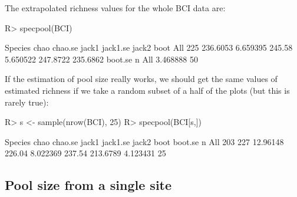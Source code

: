 \documentclass[article,nojss]{jss}
\begin{document}
The extrapolated richness values for the whole BCI data are:
\begin{Schunk}
\begin{Sinput}
R> specpool(BCI)
\end{Sinput}
\begin{Soutput}
    Species     chao  chao.se  jack1 jack1.se    jack2     boot
All     225 236.6053 6.659395 245.58 5.650522 247.8722 235.6862
     boot.se  n
All 3.468888 50
\end{Soutput}
\end{Schunk}
If the estimation of pool size really works, we should get the same
values of estimated richness if we take a random subset of a half of
the plots (but this is rarely true):
\begin{Schunk}
\begin{Sinput}
R> s <- sample(nrow(BCI), 25)
R> specpool(BCI[s,])
\end{Sinput}
\begin{Soutput}
    Species chao  chao.se  jack1 jack1.se  jack2     boot  boot.se  n
All     203  227 12.96148 226.04 8.022369 237.54 213.6789 4.123431 25
\end{Soutput}
\end{Schunk}

\subsection{Pool size from a single site}
\end{document}
